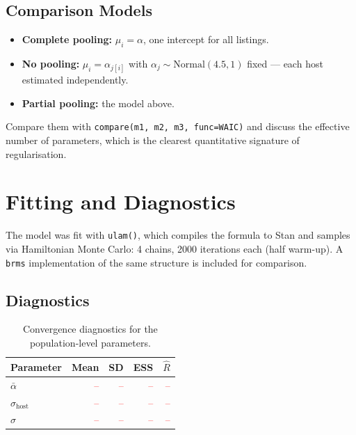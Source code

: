 \documentclass[11pt,a4paper]{article}
\begin{document}
\subsection{Comparison Models}
\begin{itemize}
  \item \textbf{Complete pooling:} $\mu_i = \alpha$, one intercept for all listings.
  \item \textbf{No pooling:} $\mu_i = \alpha_{j[i]}$ with $\alpha_j \sim \mathrm{Normal}(4.5, 1)$
        fixed --- each host estimated independently.
  \item \textbf{Partial pooling:} the model above.
\end{itemize}
Compare them with \texttt{compare(m1, m2, m3, func=WAIC)} and discuss the
effective number of parameters, which is the clearest quantitative signature of
regularisation.

\section{Fitting and Diagnostics}\label{sec:fit}

The model was fit with \texttt{ulam()}, which compiles the formula to Stan and
samples via Hamiltonian Monte Carlo: 4 chains, 2000 iterations each (half warm-up).
A \texttt{brms} implementation of the same structure is included for comparison.

\subsection{Diagnostics}

\begin{table}[htbp]
\centering
\caption{Convergence diagnostics for the population-level parameters.}
\label{tab:diagnostics}
\begin{tabular}{@{}lrrrr@{}}
\toprule
\textbf{Parameter} & \textbf{Mean} & \textbf{SD} & \textbf{ESS} & $\hat{R}$ \\
\midrule
$\bar{\alpha}$            & \textcolor{red}{--} & \textcolor{red}{--} & \textcolor{red}{--} & \textcolor{red}{--} \\
$\sigma_{\text{host}}$    & \textcolor{red}{--} & \textcolor{red}{--} & \textcolor{red}{--} & \textcolor{red}{--} \\
$\sigma$                  & \textcolor{red}{--} & \textcolor{red}{--} & \textcolor{red}{--} & \textcolor{red}{--} \\
\bottomrule
\end{tabular}
\end{table}
\end{document}
